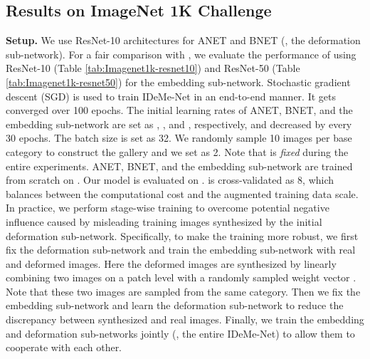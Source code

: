 \documentclass[10pt,letterpaper,twocolumn]{article}
\begin{document}
\subsection{Results on ImageNet 1K Challenge\label{subsec:Results-on-ImageNet1k}}

\noindent \textbf{Setup.} We use ResNet-10 architectures for ANET
and BNET (\ie, the deformation sub-network). For a fair comparison with \cite{2017ICCVaug,imaginaryData}, we evaluate
the performance of using ResNet-10 (Table \ref{tab:Imagenet1k-resnet10})
and ResNet-50 (Table \ref{tab:Imagenet1k-resnet50}) for the embedding
sub-network. Stochastic gradient descent (SGD) is used to train IDeMe-Net
in an end-to-end manner. It gets converged over 100 epochs. The initial
learning rates of ANET, BNET, and the embedding sub-network are set as
, , and , respectively,
and decreased by  every 30 epochs. The batch size is set as
32. We randomly sample 10 images per base category to construct the
gallery  and we set  as 2. Note that  is \emph{fixed}
during the entire experiments. ANET, BNET, and the embedding sub-network
are trained from scratch on . Our model is evaluated on
.  is cross-validated as 8, which balances between
the computational cost and the augmented training data scale. In practice, we perform stage-wise training to overcome potential negative influence caused by misleading training images synthesized by the initial deformation sub-network. Specifically, to make the training more robust, we first fix the deformation sub-network and train the embedding sub-network with real and deformed images. Here the deformed images are synthesized by linearly combining two images on a patch level with a randomly sampled weight vector . Note that these two images are sampled from the same category. Then we fix the embedding sub-network and learn the deformation sub-network to reduce the discrepancy between synthesized and real images. Finally, we train the embedding and deformation sub-networks jointly (\ie, the entire IDeMe-Net) to allow them to cooperate with each other.
\end{document}
